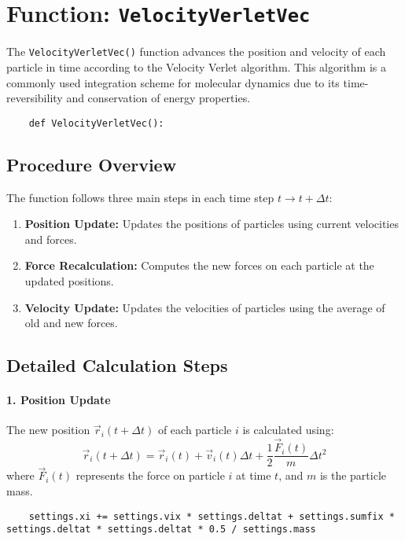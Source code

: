 \documentclass[12pt, ngerman]{report}
\begin{document}
\section{Function: \texttt{VelocityVerletVec}}
\label{sec:velocityverletvec}

The \texttt{VelocityVerletVec()} function advances the position and velocity of each particle in time according to the Velocity Verlet algorithm. This algorithm is a commonly used integration scheme for molecular dynamics due to its time-reversibility and conservation of energy properties.

\begin{verbatim}
	def VelocityVerletVec():
\end{verbatim}

\subsection*{Procedure Overview}
The function follows three main steps in each time step \( t \to t + \Delta t \):
\begin{enumerate}
	\item \textbf{Position Update:} Updates the positions of particles using current velocities and forces.
	\item \textbf{Force Recalculation:} Computes the new forces on each particle at the updated positions.
	\item \textbf{Velocity Update:} Updates the velocities of particles using the average of old and new forces.
\end{enumerate}

\subsection*{Detailed Calculation Steps}

\paragraph{1. Position Update}
The new position \(\vec{r}_i(t + \Delta t)\) of each particle \(i\) is calculated using:
\[
\vec{r}_i(t + \Delta t) = \vec{r}_i(t) + \vec{v}_i(t) \Delta t + \frac{1}{2} \frac{\vec{F}_i(t)}{m} \Delta t^2
\]
where \(\vec{F}_i(t)\) represents the force on particle \(i\) at time \(t\), and \(m\) is the particle mass.

\begin{verbatim}
	settings.xi += settings.vix * settings.deltat + settings.sumfix * settings.deltat * settings.deltat * 0.5 / settings.mass
\end{verbatim}
\end{document}
